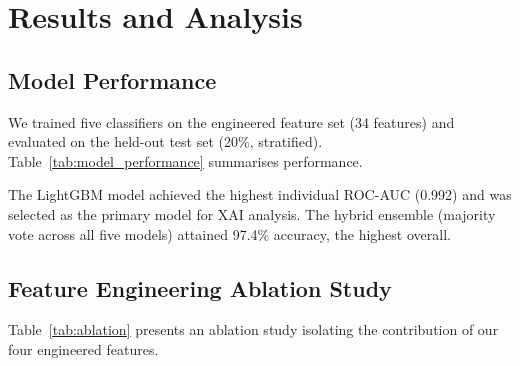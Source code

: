 \documentclass[journal]{IEEEtran}
\begin{document}
\section{Results and Analysis}

\subsection{Model Performance}

We trained five classifiers on the engineered feature set (34 features) and evaluated on the held-out test set (20\%, stratified). Table~\ref{tab:model_performance} summarises performance.

\begin{table}[htbp]
\centering
\caption{Multi-Model Performance Comparison (34 features, 5-fold CV)}
\label{tab:model_performance}
\end{table}

The LightGBM model achieved the highest individual ROC-AUC (0.992) and was selected as the primary model for XAI analysis. The hybrid ensemble (majority vote across all five models) attained 97.4\% accuracy, the highest overall.

\subsection{Feature Engineering Ablation Study}

Table~\ref{tab:ablation} presents an ablation study isolating the contribution of our four engineered features.
\end{document}

